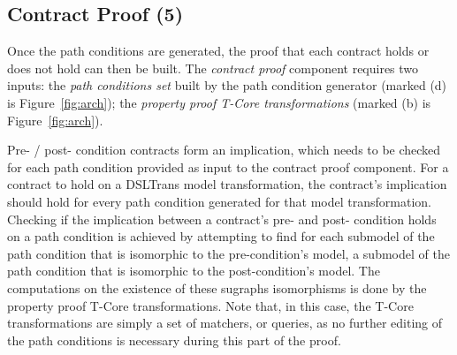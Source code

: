 
 
\subsection{Contract Proof (5)}

Once the path conditions are generated, the proof that each
contract holds or does not hold can then be built. The \emph{contract proof}
component requires two inputs: the \emph{path conditions set} built by the path
condition generator (marked (d) is Figure~\ref{fig:arch}); the \emph{property
proof T-Core transformations} (marked (b) is Figure~\ref{fig:arch}).

Pre- / post- condition contracts form an implication, which needs to be
checked for each path condition provided as input to the contract proof
component. For a contract to hold on a DSLTrans model transformation, the
contract's implication should hold for every path condition generated for
that model transformation. Checking if the implication between a contract's pre-
and post- condition holds on a path condition is achieved by attempting to find for each submodel of
the path condition that is isomorphic to the pre-condition's model, a submodel
of the path condition that is isomorphic to the post-condition's model. The
computations on the existence of these sugraphs isomorphisms is done by
the property proof T-Core transformations. Note that, in this case, the
T-Core transformations are simply a set of matchers, or queries, as no further
editing of the path conditions is necessary during this part of the proof.




